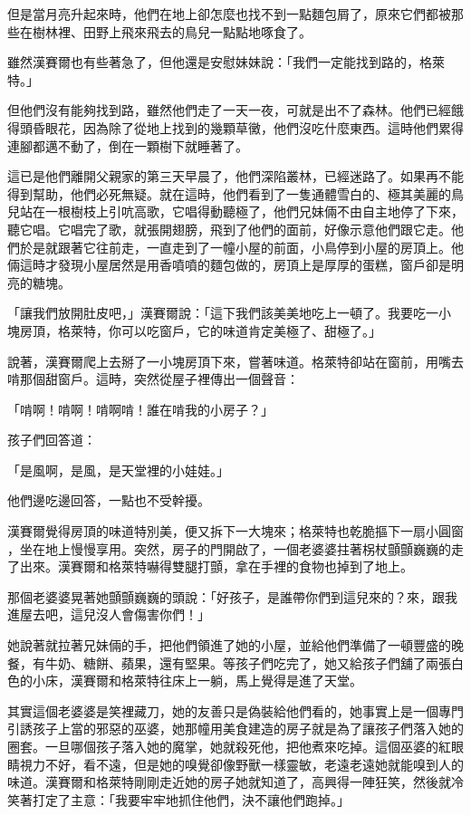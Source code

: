 \documentclass[oneside,10pt]{memoir} %
\begin{document}
但是當月亮升起來時，他們在地上卻怎麼也找不到一點麵包屑了，原來它們都被那
些在樹林裡、田野上飛來飛去的鳥兒一點點地啄食了。

雖然漢賽爾也有些著急了，但他還是安慰妹妹說：「我們一定能找到路的，格萊特。」

但他們沒有能夠找到路，雖然他們走了一天一夜，可就是出不了森林。他們已經餓
得頭昏眼花，因為除了從地上找到的幾顆草黴，他們沒吃什麼東西。這時他們累得
連腳都邁不動了，倒在一顆樹下就睡著了。

這已是他們離開父親家的第三天早晨了，他們深陷叢林，已經迷路了。如果再不能
得到幫助，他們必死無疑。就在這時，他們看到了一隻通體雪白的、極其美麗的鳥
兒站在一根樹枝上引吭高歌，它唱得動聽極了，他們兄妹倆不由自主地停了下來，
聽它唱。它唱完了歌，就張開翅膀，飛到了他們的面前，好像示意他們跟它走。他
們於是就跟著它往前走，一直走到了一幢小屋的前面，小鳥停到小屋的房頂上。他
倆這時才發現小屋居然是用香噴噴的麵包做的，房頂上是厚厚的蛋糕，窗戶卻是明
亮的糖塊。

「讓我們放開肚皮吧，」漢賽爾說：「這下我們該美美地吃上一頓了。我要吃一小
塊房頂，格萊特，你可以吃窗戶，它的味道肯定美極了、甜極了。」

說著，漢賽爾爬上去掰了一小塊房頂下來，嘗著味道。格萊特卻站在窗前，用嘴去
啃那個甜窗戶。這時，突然從屋子裡傳出一個聲音：

「啃啊！啃啊！啃啊啃！誰在啃我的小房子？」

孩子們回答道：

「是風啊，是風，是天堂裡的小娃娃。」

他們邊吃邊回答，一點也不受幹擾。

漢賽爾覺得房頂的味道特別美，便又拆下一大塊來；格萊特也乾脆摳下一扇小圓窗
，坐在地上慢慢享用。突然，房子的門開啟了，一個老婆婆拄著柺杖顫顫巍巍的走
了出來。漢賽爾和格萊特嚇得雙腿打顫，拿在手裡的食物也掉到了地上。

那個老婆婆晃著她顫顫巍巍的頭說：「好孩子，是誰帶你們到這兒來的？來，跟我
進屋去吧，這兒沒人會傷害你們！」

她說著就拉著兄妹倆的手，把他們領進了她的小屋，並給他們準備了一頓豐盛的晚
餐，有牛奶、糖餅、蘋果，還有堅果。等孩子們吃完了，她又給孩子們舖了兩張白
色的小床，漢賽爾和格萊特往床上一躺，馬上覺得是進了天堂。

其實這個老婆婆是笑裡藏刀，她的友善只是偽裝給他們看的，她事實上是一個專門
引誘孩子上當的邪惡的巫婆，她那幢用美食建造的房子就是為了讓孩子們落入她的
圈套。一旦哪個孩子落入她的魔掌，她就殺死他，把他煮來吃掉。這個巫婆的紅眼
睛視力不好，看不遠，但是她的嗅覺卻像野獸一樣靈敏，老遠老遠她就能嗅到人的
味道。漢賽爾和格萊特剛剛走近她的房子她就知道了，高興得一陣狂笑，然後就冷
笑著打定了主意：「我要牢牢地抓住他們，決不讓他們跑掉。」
\end{document}
